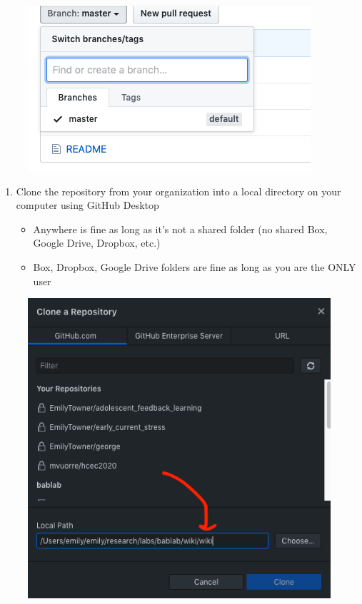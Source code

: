 \documentclass[]{book}
\providecommand{\tightlist}{%
  \setlength{\itemsep}{0pt}\setlength{\parskip}{0pt}}
\begin{document}
\begin{figure}
\centering
\includegraphics{images/research_protocols/github/21.png}
\caption{}
\end{figure}

\begin{enumerate}
\def\labelenumi{\arabic{enumi}.}
\setcounter{enumi}{1}
\tightlist
\item
  Clone the repository from your organization into a local directory on your computer using GitHub Desktop

  \begin{itemize}
  \tightlist
  \item
    Anywhere is fine as long as it's not a shared folder (no shared Box, Google Drive, Dropbox, etc.)
  \item
    Box, Dropbox, Google Drive folders are fine as long as you are the ONLY user
  \end{itemize}
\end{enumerate}

\begin{figure}
\centering
\includegraphics{images/research_protocols/github/22.png}
\caption{}
\end{figure}
\end{document}
